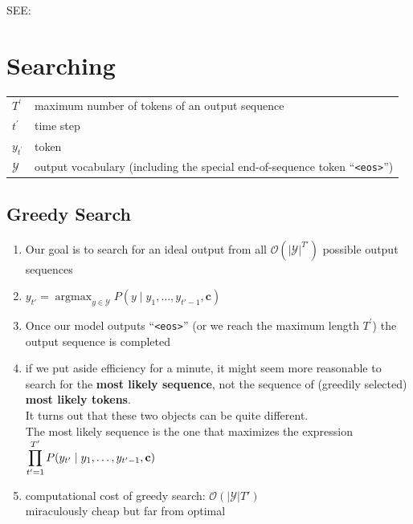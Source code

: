 SEE: 


\section{Searching}

\begin{customTableWrapper}{1.5}
\begin{longtable}{l p{8cm}}
    $T^\prime$ & maximum number of tokens of an output sequence \\
    
    $t^\prime$ & time step \\

    $y_{t^\prime}$ & token \\

    $\mathcal{Y}$ & output vocabulary (including the special end-of-sequence token “\verb|<eos>|”) \\
\end{longtable}
\end{customTableWrapper}


\subsection{Greedy Search \cite{dnn-1}} \label{nmt: Greedy Search}

\begin{enumerate}[itemsep=0.15cm]
    \item Our goal is to search for an ideal output from all $\mathcal{O}(\left|\mathcal{Y}\right|^{T'})$ possible output sequences

    \item $y_{t'} = \operatorname*{argmax}_{y \in \mathcal{Y}} P(y \mid y_1, \ldots, y_{t'-1}, \mathbf{c})$

    \item Once our model outputs “\verb|<eos>|” (or we reach the maximum length $T^\prime$) the output sequence is completed

    \item if we put aside efficiency for a minute, it might seem more reasonable to search for the \textbf{most likely sequence}, not the sequence of (greedily selected) \textbf{most likely tokens}.\\
    It turns out that these two objects can be quite different.\\
    The most likely sequence is the one that maximizes the expression $\displaystyle\prod_{t'=1}^{T'} P(y_{t'} \mid y_1, \ldots, y_{t'-1}, \mathbf{c})$

   \item computational cost of greedy search: $\mathcal{O}(\left|\mathcal{Y}\right|T')$\\
   miraculously cheap but far from optimal
\end{enumerate}

